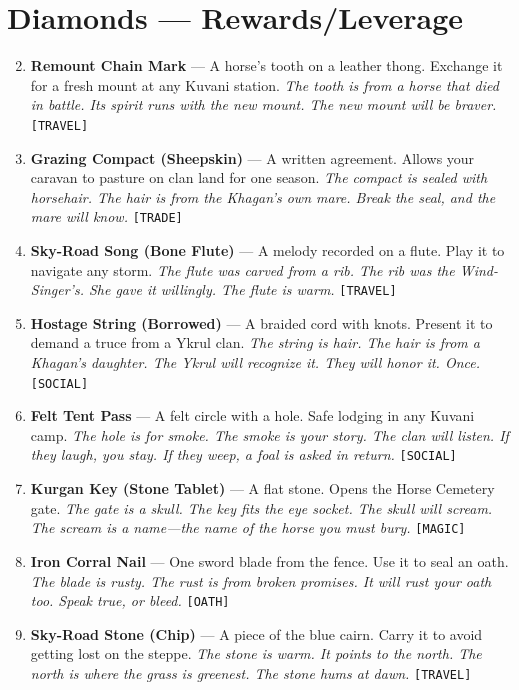 \section*{Diamonds --- Rewards/Leverage}
\label{sec:kuvani-rewards}
\begin{enumerate}
\setcounter{enumi}{1}
\item \textbf{Remount Chain Mark} --- A horse's tooth on a leather thong. Exchange it for a fresh mount at any Kuvani station.
  \hfill \textit{The tooth is from a horse that died in battle. Its spirit runs with the new mount. The new mount will be braver.} \texttt{[TRAVEL]}
\item \textbf{Grazing Compact (Sheepskin)} --- A written agreement. Allows your caravan to pasture on clan land for one season.
  \hfill \textit{The compact is sealed with horsehair. The hair is from the Khagan's own mare. Break the seal, and the mare will know.} \texttt{[TRADE]}
\item \textbf{Sky-Road Song (Bone Flute)} --- A melody recorded on a flute. Play it to navigate any storm.
  \hfill \textit{The flute was carved from a rib. The rib was the Wind-Singer's. She gave it willingly. The flute is warm.} \texttt{[TRAVEL]}
\item \textbf{Hostage String (Borrowed)} --- A braided cord with knots. Present it to demand a truce from a Ykrul clan.
  \hfill \textit{The string is hair. The hair is from a Khagan's daughter. The Ykrul will recognize it. They will honor it. Once.} \texttt{[SOCIAL]}
\item \textbf{Felt Tent Pass} --- A felt circle with a hole. Safe lodging in any Kuvani camp.
  \hfill \textit{The hole is for smoke. The smoke is your story. The clan will listen. If they laugh, you stay. If they weep, a foal is asked in return.} \texttt{[SOCIAL]}
\item \textbf{Kurgan Key (Stone Tablet)} --- A flat stone. Opens the Horse Cemetery gate.
  \hfill \textit{The gate is a skull. The key fits the eye socket. The skull will scream. The scream is a name---the name of the horse you must bury.} \texttt{[MAGIC]}
\item \textbf{Iron Corral Nail} --- One sword blade from the fence. Use it to seal an oath.
  \hfill \textit{The blade is rusty. The rust is from broken promises. It will rust your oath too. Speak true, or bleed.} \texttt{[OATH]}
\item \textbf{Sky-Road Stone (Chip)} --- A piece of the blue cairn. Carry it to avoid getting lost on the steppe.
  \hfill \textit{The stone is warm. It points to the north. The north is where the grass is greenest. The stone hums at dawn.} \texttt{[TRAVEL]}

\end{enumerate}
